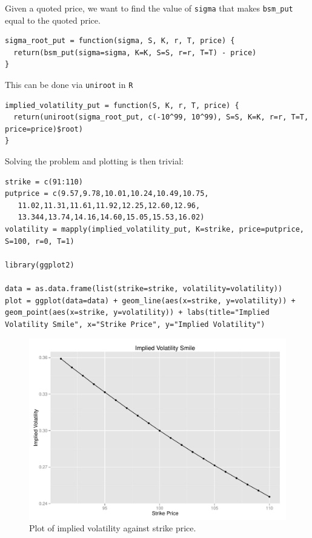 \documentclass[11pt]{scrartcl}
\begin{document}
Given a quoted price, we want to find the value of \texttt{sigma} that makes \texttt{bsm\_put} equal to the quoted price.

\begin{lstlisting}
sigma_root_put = function(sigma, S, K, r, T, price) {
  return(bsm_put(sigma=sigma, K=K, S=S, r=r, T=T) - price)
}
\end{lstlisting}

This can be done via \texttt{uniroot} in \texttt{R}

\begin{lstlisting}
implied_volatility_put = function(S, K, r, T, price) {
  return(uniroot(sigma_root_put, c(-10^99, 10^99), S=S, K=K, r=r, T=T, price=price)$root)
}
\end{lstlisting}

Solving the problem and plotting is then trivial:

\begin{lstlisting}
strike = c(91:110)
putprice = c(9.57,9.78,10.01,10.24,10.49,10.75,
   11.02,11.31,11.61,11.92,12.25,12.60,12.96,
   13.344,13.74,14.16,14.60,15.05,15.53,16.02)
volatility = mapply(implied_volatility_put, K=strike, price=putprice, S=100, r=0, T=1)

library(ggplot2)

data = as.data.frame(list(strike=strike, volatility=volatility))
plot = ggplot(data=data) + geom_line(aes(x=strike, y=volatility)) + geom_point(aes(x=strike, y=volatility)) + labs(title="Implied Volatility Smile", x="Strike Price", y="Implied Volatility")
\end{lstlisting}

\begin{figure}[H]
\centering\includegraphics[width=\textwidth]{./hw8/implied_volatility.pdf}
\caption{Plot of implied volatility against strike price.}
\end{figure}
\end{document}
